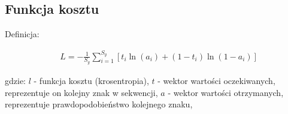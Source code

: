 \subsection{Funkcja kosztu}

Definicja:

\begin{align*}
  &L = - \frac{1}{S_y}\sum_{i=1}^{S_y}[t_i\ln(a_i) + (1-t_i)\ln(1-a_i)]
\end{align*}

gdzie: \newline
$l$ - funkcja kosztu (krosentropia), \newline
$t$ - wektor wartości oczekiwanych, reprezentuje on kolejny znak w sekwencji, \newline
$a$ - wektor wartości otrzymanych, reprezentuje prawdopodobieństwo kolejnego znaku,  \newline
